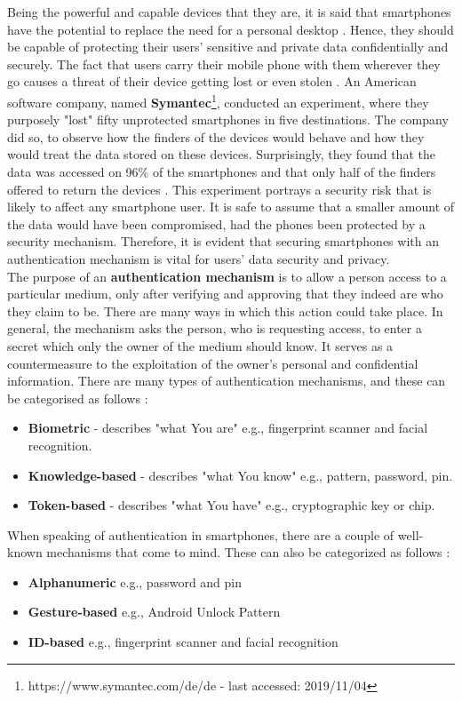 Being the powerful and capable devices that they are, it is said that smartphones have the potential to replace the need for a personal desktop \cite{Alsaleh}. Hence, they should be capable of protecting their users' sensitive and private data confidentially and securely. The fact that users carry their mobile phone with them wherever they go causes a threat of their device getting lost or even stolen \cite{Egelman:2014:YRL:2660267.2660273}. An American software company, named \textbf{Symantec}\footnote{https://www.symantec.com/de/de - last accessed: 2019/11/04}, conducted an experiment, where they purposely "lost" fifty unprotected smartphones in five destinations. The company did so, to observe how the finders of the devices would behave and how they would treat the data stored on these devices. Surprisingly, they found that the data was accessed on 96\% of the smartphones and that only half of the finders offered to return the devices \cite{symantec}.  This experiment portrays a security risk that is likely to affect any smartphone user.  It is safe to assume that a smaller amount of the data would have been compromised, had the phones been protected by a security mechanism. Therefore, it is evident that securing smartphones with an authentication mechanism is vital for users' data security and privacy.\\

The purpose of an \textbf{authentication mechanism} is to allow a person access to a particular medium, only after verifying and approving that they indeed are who they claim to be. There are many ways in which this action could take place. In general, the mechanism asks the person, who is requesting access, to enter a secret which only the owner of the medium should know. It serves as a countermeasure to the exploitation of the owner's personal and confidential information. There are many types of authentication mechanisms, and these can be categorised as follows \cite{gorman}: 
\begin{itemize}
    \item \textbf{Biometric} - describes "what You are" e.g., fingerprint scanner and facial recognition.
    \item \textbf{Knowledge-based} - describes "what You know" e.g., pattern, password, pin.
    \item \textbf{Token-based} - describes "what You have" e.g., cryptographic key or chip.
\end{itemize}


When speaking of authentication in smartphones, there are a couple of well-known mechanisms that come to mind. These can also be categorized as follows \cite{ediss20251,gorman} : 
\begin{itemize}
    \item \textbf{Alphanumeric} e.g., password and pin
    \item \textbf{Gesture-based} e.g., Android Unlock Pattern
    \item \textbf{ID-based} e.g., fingerprint scanner and facial recognition 
\end{itemize}

